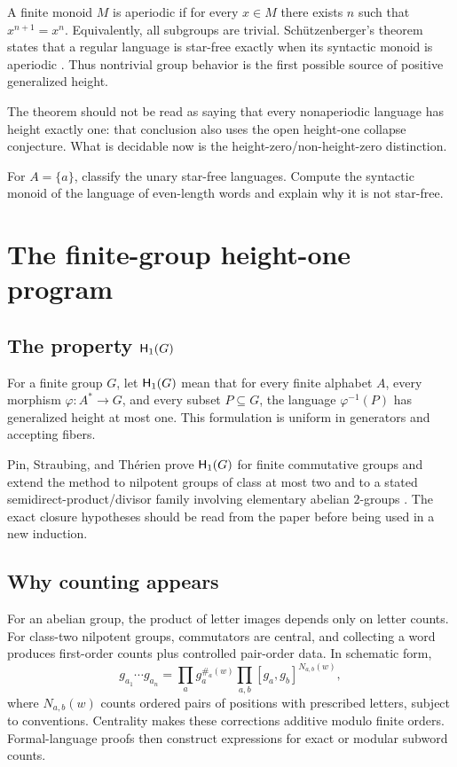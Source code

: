 \documentclass{amsart}
\begin{document}
A finite monoid $M$ is aperiodic if for every $x\in M$ there exists $n$ such that $x^{n+1}=x^n$.  Equivalently, all subgroups are trivial.  Sch\"utzenberger's theorem states that a regular language is star-free exactly when its syntactic monoid is aperiodic \cite{schutzenberger1965finite}.  Thus nontrivial group behavior is the first possible source of positive generalized height.

The theorem should not be read as saying that every nonaperiodic language has height exactly one: that conclusion also uses the open height-one collapse conjecture.  What is decidable now is the height-zero/non-height-zero distinction.

\begin{exercise}
For $A=\{a\}$, classify the unary star-free languages.  Compute the syntactic monoid of the language of even-length words and explain why it is not star-free.
\end{exercise}

\section{The finite-group height-one program}

\subsection{The property $\mathsf{H}_{1}(G)$}

For a finite group $G$, let $\mathsf{H}_{1}(G)$ mean that for every finite alphabet $A$, every morphism $\varphi:A^\ast\to G$, and every subset $P\subseteq G$, the language $\varphi^{-1}(P)$ has generalized height at most one.  This formulation is uniform in generators and accepting fibers.

Pin, Straubing, and Th\'erien prove $\mathsf{H}_{1}(G)$ for finite commutative groups and extend the method to nilpotent groups of class at most two and to a stated semidirect-product/divisor family involving elementary abelian $2$-groups \cite{pinStraubingTherien1992}.  The exact closure hypotheses should be read from the paper before being used in a new induction.

\subsection{Why counting appears}

For an abelian group, the product of letter images depends only on letter counts.  For class-two nilpotent groups, commutators are central, and collecting a word produces first-order counts plus controlled pair-order data.  In schematic form,
\[
  g_{a_1}\cdots g_{a_n}
  =\prod_a g_a^{\#_a(w)}
   \prod_{a,b}[g_a,g_b]^{N_{a,b}(w)},
\]
where $N_{a,b}(w)$ counts ordered pairs of positions with prescribed letters, subject to conventions.  Centrality makes these corrections additive modulo finite orders.  Formal-language proofs then construct expressions for exact or modular subword counts.
\end{document}
